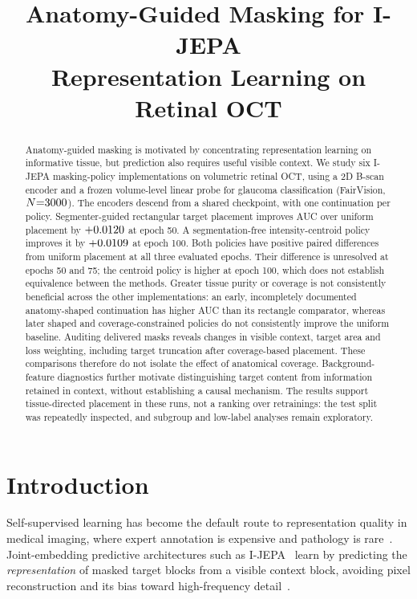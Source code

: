 \documentclass{article}
\title{Anatomy-Guided Masking for I-JEPA\\
Representation Learning on Retinal OCT}
\author{}
\begin{document}
\maketitle

\begin{abstract}
Anatomy-guided masking is motivated by concentrating representation learning
on informative tissue, but prediction also requires useful visible context.
We study six I-JEPA masking-policy implementations on volumetric retinal OCT,
using a 2D B-scan encoder and a frozen volume-level linear probe for glaucoma
classification (FairVision, $N{=}3000$). The encoders descend from a shared
checkpoint, with one continuation per policy. Segmenter-guided rectangular
target placement improves AUC over uniform placement by
$+0.0120$ at epoch 50. A segmentation-free intensity-centroid
policy improves it by $+0.0109$ at epoch 100.
Both policies have positive paired differences from uniform placement at all
three evaluated epochs. Their difference is unresolved at epochs 50 and 75;
the centroid policy is higher at epoch 100, which does not establish
equivalence between the methods. Greater tissue purity or coverage is not
consistently beneficial across the other implementations: an early,
incompletely documented anatomy-shaped continuation has higher AUC than its
rectangle comparator, whereas later shaped and
coverage-constrained policies do not consistently improve the uniform baseline.
Auditing delivered masks reveals changes in visible context, target area and
loss weighting, including target truncation after coverage-based placement.
These comparisons therefore do not isolate the effect of anatomical coverage.
Background-feature diagnostics further motivate distinguishing target content
from information retained in context, without establishing a causal mechanism.
The results support tissue-directed placement in these runs, not a ranking
over retrainings: the test split was repeatedly inspected, and subgroup and
low-label analyses remain exploratory.
\end{abstract}

\section{Introduction}

Self-supervised learning has become the default route to representation quality
in medical imaging, where expert annotation is expensive and pathology is
rare~\citep{azizi2021big,zhou2023retfound,qiu2024visionfm}. Joint-embedding
predictive architectures such as I-JEPA~\citep{assran2023ijepa} learn by
predicting the \emph{representation} of masked target blocks from a visible
context block, avoiding pixel reconstruction and its bias toward high-frequency
detail~\citep{he2022mae,xie2022simmim}.
\end{document}
